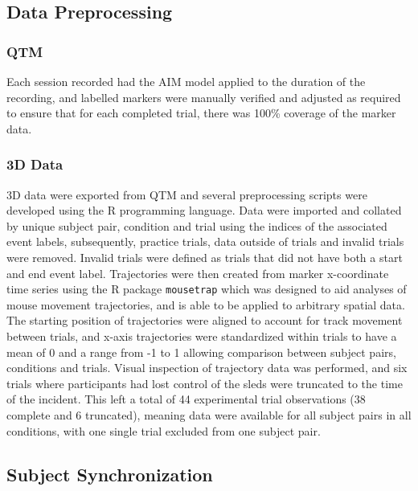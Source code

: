 \documentclass[10pt,a4paper,onecolumn]{article}
\begin{document}
\hypertarget{data-preprocessing}{%
\subsection{Data Preprocessing}\label{data-preprocessing}}

\hypertarget{qtm}{%
\subsubsection{QTM}\label{qtm}}

Each session recorded had the AIM model applied to the duration of the recording, and labelled markers were manually verified and adjusted as required to ensure that for each completed trial, there was 100\% coverage of the marker data.

\hypertarget{d-data}{%
\subsubsection{3D Data}\label{d-data}}

3D data were exported from QTM and several preprocessing scripts were developed using the R programming language. Data were imported and collated by unique subject pair, condition and trial using the indices of the associated event labels, subsequently, practice trials, data outside of trials and invalid trials were removed. Invalid trials were defined as trials that did not have both a start and end event label. Trajectories were then created from marker x-coordinate time series using the R package \texttt{mousetrap} \autocite{mousetrap2021} which was designed to aid analyses of mouse movement trajectories, and is able to be applied to arbitrary spatial data. The starting position of trajectories were aligned to account for track movement between trials, and x-axis trajectories were standardized within trials to have a mean of 0 and a range from -1 to 1 allowing comparison between subject pairs, conditions and trials. Visual inspection of trajectory data was performed, and six trials where participants had lost control of the sleds were truncated to the time of the incident. This left a total of 44 experimental trial observations (38 complete and 6 truncated), meaning data were available for all subject pairs in all conditions, with one single trial excluded from one subject pair.

\hypertarget{subject-synchronization}{%
\subsection{Subject Synchronization}\label{subject-synchronization}}
\end{document}
